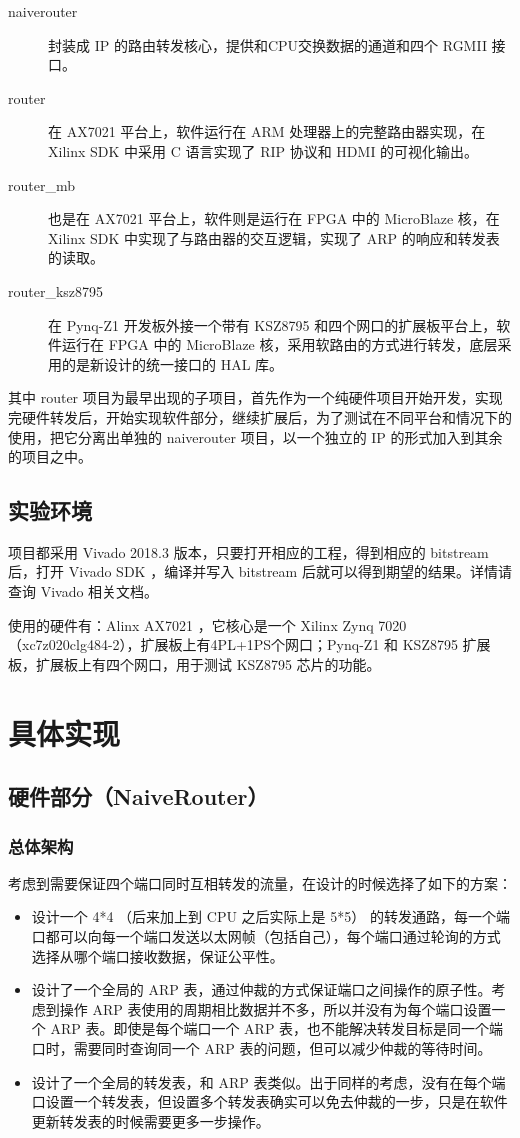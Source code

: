 \documentclass{ctexart}
\begin{document}
  \begin{description}
    \item[naiverouter] 封装成 IP 的路由转发核心，提供和CPU交换数据的通道和四个 RGMII 接口。
    \item[router]  在 AX7021 平台上，软件运行在 ARM 处理器上的完整路由器实现，在 Xilinx SDK 中采用 C 语言实现了 RIP 协议和 HDMI 的可视化输出。
    \item[router\_mb] 也是在 AX7021 平台上，软件则是运行在 FPGA 中的 MicroBlaze  核，在 Xilinx SDK 中实现了与路由器的交互逻辑，实现了 ARP 的响应和转发表的读取。
    \item[router\_ksz8795] 在 Pynq-Z1 开发板外接一个带有 KSZ8795 和四个网口的扩展板平台上，软件运行在 FPGA 中的 MicroBlaze 核，采用软路由的方式进行转发，底层采用的是新设计的统一接口的 HAL 库。
  \end{description}

  其中 router 项目为最早出现的子项目，首先作为一个纯硬件项目开始开发，实现完硬件转发后，开始实现软件部分，继续扩展后，为了测试在不同平台和情况下的使用，把它分离出单独的 naiverouter 项目，以一个独立的 IP 的形式加入到其余的项目之中。

\subsection{实验环境}
  项目都采用 Vivado 2018.3 版本，只要打开相应的工程，得到相应的 bitstream 后，打开 Vivado SDK ，编译并写入 bitstream 后就可以得到期望的结果。详情请查询 Vivado 相关文档。

  使用的硬件有：Alinx AX7021 ，它核心是一个 Xilinx Zynq 7020 （xc7z020clg484-2），扩展板上有4PL+1PS个网口；Pynq-Z1 和 KSZ8795 扩展板，扩展板上有四个网口，用于测试 KSZ8795 芯片的功能。

\section{具体实现}
\subsection{硬件部分（NaiveRouter）}
\subsubsection{总体架构}
  考虑到需要保证四个端口同时互相转发的流量，在设计的时候选择了如下的方案：
  
  \begin{itemize}
    \item 设计一个 4*4 （后来加上到 CPU 之后实际上是 5*5） 的转发通路，每一个端口都可以向每一个端口发送以太网帧（包括自己），每个端口通过轮询的方式选择从哪个端口接收数据，保证公平性。
    \item 设计了一个全局的 ARP 表，通过仲裁的方式保证端口之间操作的原子性。考虑到操作 ARP 表使用的周期相比数据并不多，所以并没有为每个端口设置一个 ARP 表。即使是每个端口一个 ARP 表，也不能解决转发目标是同一个端口时，需要同时查询同一个 ARP 表的问题，但可以减少仲裁的等待时间。
    \item 设计了一个全局的转发表，和 ARP 表类似。出于同样的考虑，没有在每个端口设置一个转发表，但设置多个转发表确实可以免去仲裁的一步，只是在软件更新转发表的时候需要更多一步操作。
  \end{itemize}
\end{document}
